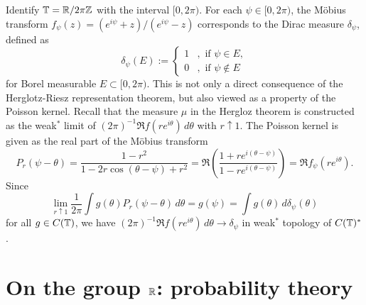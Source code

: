 \documentclass[12pt]{article}
\begin{document}
\begin{ex}
Identify $\T=\R/2\pi\Z$ with the interval $[0,2\pi)$.
For each $\psi\in[0,2\pi)$, the M\"obius transform $f_\psi(z)=(e^{i\psi}+z)/(e^{i\psi}-z)$ corresponds to the Dirac measure $\delta_\psi$, defined as
\[\delta_\psi(E):=\begin{cases}1&,\text{ if }\psi\in E,\\0&,\text{ if }\psi\notin E\end{cases}\]
for Borel measurable $E\subset[0,2\pi)$.
This is not only a direct consequence of the Herglotz-Riesz representation theorem, but also viewed as a property of the Poisson kernel.
Recall that the measure $\mu$ in the Hergloz theorem is constructed as the weak$^*$ limit of $(2\pi)^{-1}\Re f(re^{i\theta})\,d\theta$ with $r\uparrow1$.
The Poisson kernel is given as the real part of the M\"obius transform
\[P_r(\psi-\theta)=\frac{1-r^2}{1-2r\cos(\theta-\psi)+r^2}=\Re\left(\frac{1+re^{i(\theta-\psi)}}{1-re^{i(\theta-\psi)}}\right)=\Re f_\psi(re^{i\theta}).\]
Since
\[\lim_{r\uparrow1}\frac1{2\pi}\int g(\theta)P_r(\psi-\theta)\,d\theta=g(\psi)=\int g(\theta)\,d\delta_\psi(\theta)\]
for all $g\in C(\mathbb{T})$, we have $(2\pi)^{-1}\Re f(re^{i\theta})\,d\theta\to\delta_\psi$ in weak$^*$ topology of $C(\mathbb{T})^*$.
\end{ex}

\iffalse
\begin{ex}[Continuous restrictions]
Let $f$ be a Carath\'eodory function and $\tau:\D\to\D$ be an analytic function on the open unit disk $\D$.
Then, the composition $f\circ\tau$ is Carath\'eodory.
The probability measure on $\T$ corresponded to this function
\end{ex}

\begin{ex}[Circle homeomorphism]
For example, if a Carath\'eodory function $f$ and a probability measure $\mu$ on $\T=\R/2\pi\Z$ satisfies
\[f(z)=\int\frac{e^{i\theta}+z}{e^{i\theta}-z}\,d\mu(\theta),\]
then
\[f(\tau(z))=\int\frac{e^{i\theta}+z}{e^{i\theta}-z}\,d\mu'(\theta),\]
where
\end{ex}
\fi













\newpage
\section{On the group $\mathbb{R}$: probability theory}
\end{document}
